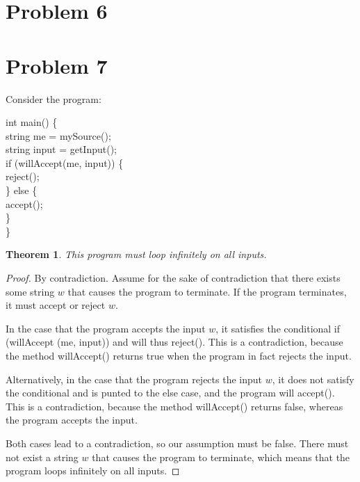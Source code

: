\documentclass[10pt,letter]{article}
\newtheorem*{thm}{Theorem}
\begin{document}
\section*{Problem 6}
\section*{Problem 7}

Consider the program:
{\selectfont

\hspace*{10 mm} int main() \{\\
\hspace*{20 mm} string me = mySource();\\
\hspace*{20 mm} string input = getInput();\\
\hspace*{20 mm} if (willAccept(me, input)) \{\\
\hspace*{30 mm} reject();\\
\hspace*{20 mm} \} else \{\\
\hspace*{30 mm} accept();\\
\hspace*{20 mm} \}\\
\hspace*{10 mm} \}
}
\begin{thm}This program must loop infinitely on all inputs.\end{thm}
\begin{proof}
By contradiction. Assume for the sake of contradiction that there exists some string $w$ that causes the program to terminate. If the program terminates, it must accept or reject $w$. 

In the case that the program accepts the input $w$, it satisfies the conditional {\selectfont if (willAccept (me, input))} and will thus {\selectfont reject()}. This is a contradiction, because the method {\selectfont willAccept()} returns true when the program in fact rejects the input.

Alternatively, in the case that the program rejects the input $w$, it does not satisfy the conditional and is punted to the {\selectfont else} case, and the program will {\selectfont accept()}. This is a contradiction, because the method {\selectfont willAccept()} returns false, whereas the program accepts the input.

Both cases lead to a contradiction, so our assumption must be false. There must not exist a string $w$ that causes the program to terminate, which means that the program loops infinitely on all inputs. 
\end{proof}
\end{document}
